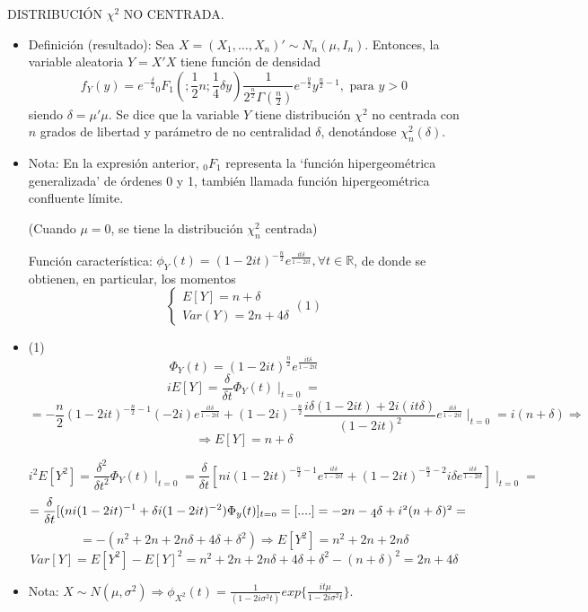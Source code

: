 \documentclass[11pt,a4paper]{article}
\begin{document}
DISTRIBUCIÓN $\chi^{2}$ NO CENTRADA.
\begin{itemize}
\item Definición (resultado): Sea $X = (X_{1}, \dots, X_{n})' \sim N_{n}(\mu, I_{n})$. Entonces, la variable aleatoria $Y = X'X$ tiene función de densidad
$$f_{Y}(y) = e^{-\frac{\delta}{2}}{}_{0}F_{1}(;\frac{1}{2}n; \frac{1}{4}\delta y) \frac{1}{2^{\frac{n}{2}}\Gamma(\frac{n}{2})}e^{-\frac{y}{2}}y^{\frac{n}{2}-1}, \text{ para } y > 0$$
siendo $\delta = \mu'\mu$. Se dice que la variable $Y$ tiene distribución $\chi^{2}$ no centrada con $n$ grados de libertad y parámetro de no centralidad $\delta$, denotándose $\chi_{n}^{2}(\delta)$.

\item Nota: En la expresión anterior, ${}_{0}F_{1}$ representa la `función hipergeométrica generalizada' de órdenes 0 y 1, también llamada función hipergeométrica confluente límite.

(Cuando $\mu=0$, se tiene la distribución $\chi_{n}^{2}$ centrada)

Función característica: $\phi_{Y}(t) = (1 - 2it)^{-\frac{n}{2}}e^{\frac{it\delta}{1-2it}}, \forall t \in \mathbb{R}$, de donde se obtienen, en particular, los momentos
$$\begin{cases}
E[Y] = n + \delta \\
Var(Y) = 2n + 4\delta
\end{cases} (1)$$

\item (1) $$\Phi_{Y}(t) = (1 - 2it)^{\frac{n}{2}} e^{\frac{it\delta}{1-2it}}$$
$$iE[Y] = \frac{\delta}{\delta t} \Phi_{Y}(t) \mid_{t=0} =$$
$$=-\frac{n}{2}(1-2it)^{-\frac{n}{2}-1}(-2i)e^{\frac{it\delta}{1-2it}} + (1-2i)^{-\frac{n}{2}} \frac{i\delta(1-2it)+2i(it\delta)}{(1-2it)^{2}}e^{\frac{it\delta}{1-2it}} \mid_{t=0} = i(n+\delta) \Rightarrow$$
$$\Rightarrow E[Y] = n + \delta$$

$$i^{2}E[Y^{2}] = \frac{\delta^{2}}{\delta t^{2}} \Phi_{Y}(t) \mid_{t=0} = \frac{\delta}{\delta t}[ni(1 - 2it)^{-\frac{n}{2}-1} e^{\frac{it\delta}{1-2it}} + (1-2it)^{-\frac{n}{2}-2} i\delta e^{\frac{it\delta}{1-2it}}] \mid_{t=0} =$$
$$= \frac{\delta}{\delta t}[(ni(1-2it)^{-1} + \delta i(1-2it)^{-2})\Phi_{y}(t)] \mit_{t=0} = [....] = -2n -4\delta + i^{2}(n+\delta)^{2} =$$
$$= - (n^{2}+2n+2n\delta+4\delta+\delta^{2}) \Rightarrow E[Y^{2}] = n^{2}+2n+2n\delta$$
$$Var[Y] = E[Y^{2}] - E[Y]^{2} = n^{2}+2n+2n\delta + 4\delta+\delta^{2}-(n+\delta)^{2} = 2n+4\delta$$

\item Nota: $X \sim N(\mu, \sigma^{2}) \Rightarrow \phi_{X^{2}}(t) = \frac{1}{(1-2i\sigma^{2}t)} exp\{\frac{it\mu}{1-2i\sigma^{2}t}\}$.


\end{itemize}
\end{document}
